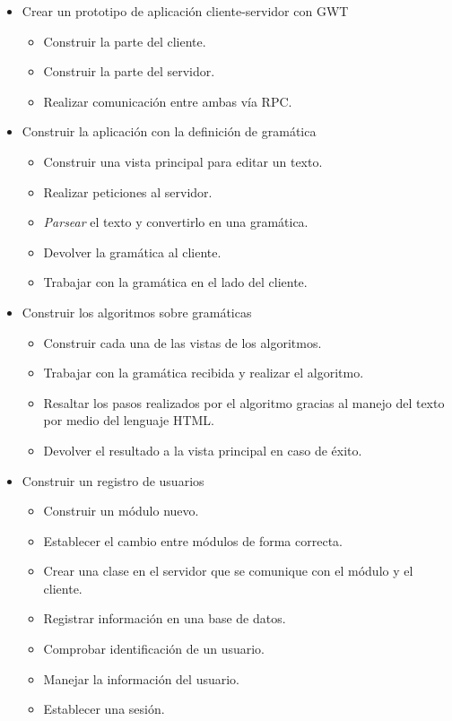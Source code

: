 \begin{itemize}
\item Crear un prototipo de aplicación cliente-servidor con GWT

	\begin{itemize}
	\item Construir la parte del cliente.
	\item Construir la parte del servidor. 
	\item Realizar comunicación entre ambas vía RPC.
	\end{itemize}

\item Construir la aplicación con la definición de gramática
	\begin{itemize}
	\item Construir una vista principal para editar un texto.
	\item Realizar peticiones al servidor. 
	\item \emph{Parsear} el texto y convertirlo en una gramática.
	\item Devolver la gramática al cliente.
	\item Trabajar con la gramática en el lado del cliente.
	\end{itemize}
\item Construir los algoritmos sobre gramáticas
	\begin{itemize}
	\item Construir cada una de las vistas de los algoritmos.
	\item Trabajar con la gramática recibida y realizar el algoritmo.
	\item Resaltar los pasos realizados por el algoritmo gracias al manejo del texto por medio del lenguaje HTML.
	\item Devolver el resultado a la vista principal en caso de éxito.
	\end{itemize}
\item Construir un registro de usuarios
	\begin{itemize}
	\item Construir un módulo nuevo.
	\item Establecer el cambio entre módulos de forma correcta.
	\item Crear una clase en el servidor que se comunique con el módulo y el cliente.
	\item Registrar información en una base de datos.
	\item Comprobar identificación de un usuario.
	\item Manejar la información del usuario.
	\item Establecer una sesión.
	\end{itemize}
\end{itemize}
